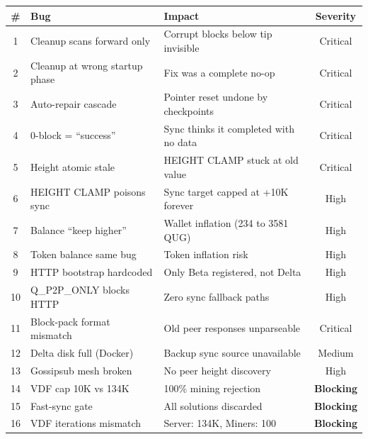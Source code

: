 \documentclass[11pt,a4paper]{article}
\begin{document}
\begin{center}
\small
\begin{tabularx}{\textwidth}{c l X c}
\toprule
\textbf{\#} & \textbf{Bug} & \textbf{Impact} & \textbf{Severity} \\
\midrule
1 & Cleanup scans forward only & Corrupt blocks below tip invisible & \textcolor{qnkred}{Critical} \\
2 & Cleanup at wrong startup phase & Fix was a complete no-op & \textcolor{qnkred}{Critical} \\
3 & Auto-repair cascade & Pointer reset undone by checkpoints & \textcolor{qnkred}{Critical} \\
4 & 0-block = ``success'' & Sync thinks it completed with no data & \textcolor{qnkred}{Critical} \\
5 & Height atomic stale & HEIGHT CLAMP stuck at old value & \textcolor{qnkred}{Critical} \\
6 & HEIGHT CLAMP poisons sync & Sync target capped at +10K forever & \textcolor{qnkpurple}{High} \\
7 & Balance ``keep higher'' & Wallet inflation (234 to 3581 QUG) & \textcolor{qnkpurple}{High} \\
8 & Token balance same bug & Token inflation risk & \textcolor{qnkpurple}{High} \\
9 & HTTP bootstrap hardcoded & Only Beta registered, not Delta & \textcolor{qnkpurple}{High} \\
10 & Q\_P2P\_ONLY blocks HTTP & Zero sync fallback paths & \textcolor{qnkpurple}{High} \\
11 & Block-pack format mismatch & Old peer responses unparseable & \textcolor{qnkred}{Critical} \\
12 & Delta disk full (Docker) & Backup sync source unavailable & \textcolor{qnkteal}{Medium} \\
13 & Gossipsub mesh broken & No peer height discovery & \textcolor{qnkpurple}{High} \\
14 & VDF cap 10K vs 134K & 100\% mining rejection & \textcolor{qnkred}{\textbf{Blocking}} \\
15 & Fast-sync gate & All solutions discarded & \textcolor{qnkred}{\textbf{Blocking}} \\
16 & VDF iterations mismatch & Server: 134K, Miners: 100 & \textcolor{qnkred}{\textbf{Blocking}} \\
\bottomrule
\end{tabularx}
\end{center}

\end{document}
